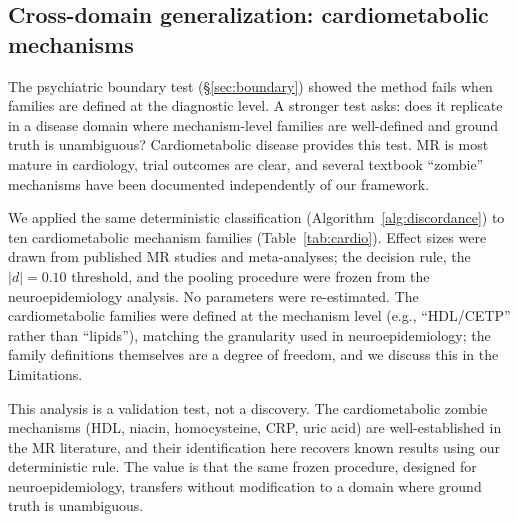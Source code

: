 \documentclass[11pt]{article}
\begin{document}
\subsection{Cross-domain generalization: cardiometabolic mechanisms}
\label{sec:cardio}

The psychiatric boundary test (\S\ref{sec:boundary}) showed the method fails when families are defined at the diagnostic level. A stronger test asks: does it replicate in a disease domain where mechanism-level families are well-defined and ground truth is unambiguous? Cardiometabolic disease provides this test. MR is most mature in cardiology, trial outcomes are clear, and several textbook ``zombie'' mechanisms have been documented independently of our framework.

We applied the same deterministic classification (Algorithm~\ref{alg:discordance}) to ten cardiometabolic mechanism families (Table~\ref{tab:cardio}). Effect sizes were drawn from published MR studies and meta-analyses; the decision rule, the $|d| = 0.10$ threshold, and the pooling procedure were frozen from the neuroepidemiology analysis. No parameters were re-estimated. The cardiometabolic families were defined at the mechanism level (e.g., ``HDL/CETP'' rather than ``lipids''), matching the granularity used in neuroepidemiology; the family definitions themselves are a degree of freedom, and we discuss this in the Limitations.

This analysis is a validation test, not a discovery. The cardiometabolic zombie mechanisms (HDL, niacin, homocysteine, CRP, uric acid) are well-established in the MR literature, and their identification here recovers known results using our deterministic rule. The value is that the same frozen procedure, designed for neuroepidemiology, transfers without modification to a domain where ground truth is unambiguous.
\end{document}
